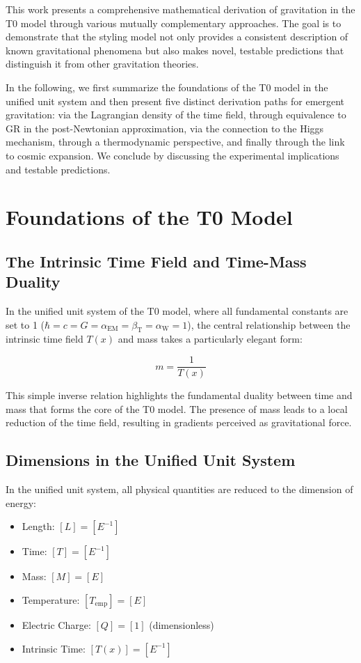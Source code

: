 \documentclass[12pt,a4paper]{article}
\newcommand{\Tfield}{T(x)}
\newcommand{\betaT}{\beta_{\text{T}}}
\newcommand{\alphaEM}{\alpha_{\text{EM}}}
\newcommand{\alphaW}{\alpha_{\text{W}}}
\begin{document}
	This work presents a comprehensive mathematical derivation of gravitation in the T0 model through various mutually complementary approaches. The goal is to demonstrate that the styling model not only provides a consistent description of known gravitational phenomena but also makes novel, testable predictions that distinguish it from other gravitation theories.
	
	In the following, we first summarize the foundations of the T0 model in the unified unit system and then present five distinct derivation paths for emergent gravitation: via the Lagrangian density of the time field, through equivalence to GR in the post-Newtonian approximation, via the connection to the Higgs mechanism, through a thermodynamic perspective, and finally through the link to cosmic expansion. We conclude by discussing the experimental implications and testable predictions.
	
	\section{Foundations of the T0 Model}
	
	\subsection{The Intrinsic Time Field and Time-Mass Duality}
	In the unified unit system of the T0 model, where all fundamental constants are set to 1 (\(\hbar = c = G = \alphaEM = \betaT = \alphaW = 1\)), the central relationship between the intrinsic time field \(\Tfield\) and mass takes a particularly elegant form:
	
	\begin{equation}
		m = \frac{1}{\Tfield}
	\end{equation}
	
	This simple inverse relation highlights the fundamental duality between time and mass that forms the core of the T0 model. The presence of mass leads to a local reduction of the time field, resulting in gradients perceived as gravitational force.
	
	\subsection{Dimensions in the Unified Unit System}
	In the unified unit system, all physical quantities are reduced to the dimension of energy:
	
	\begin{itemize}
		\item Length: $[L] = [E^{-1}]$
		\item Time: $[T] = [E^{-1}]$
		\item Mass: $[M] = [E]$
		\item Temperature: $[T_{\text{emp}}] = [E]$
		\item Electric Charge: $[Q] = [1]$ (dimensionless)
		\item Intrinsic Time: $[\Tfield] = [E^{-1}]$
	\end{itemize}
	
\end{document}
